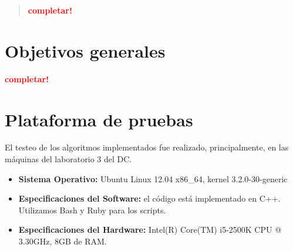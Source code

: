 \documentclass[a4paper]{article}
\begin{document}

\thispagestyle{empty}

\maketitle
\newpage

\thispagestyle{empty}
\vfill
\begin{abstract}
    \textcolor{red}{\textbf{completar!}}
\end{abstract}

\thispagestyle{empty}
\vspace{3cm}
\tableofcontents
\newpage


\newpage

\section{Objetivos generales}
  \textcolor{red}{\textbf{completar!}}

\newpage

\section{Plataforma de pruebas}
El testeo de los algoritmos implementados fue realizado, principalmente, en las máquinas del laboratorio 3 del DC. \newline
\begin{itemize}
  \item \textbf{Sistema Operativo:} Ubuntu Linux 12.04 x86_64, kernel 3.2.0-30-generic
  
  \item \textbf{Especificaciones del Software:} el código está implementado en C++. Utilizamos Bash y Ruby para los scripts.
  
  \item \textbf{Especificaciones del Hardware:} Intel(R) Core(TM) i5-2500K CPU @ 3.30GHz, 8GB de RAM.
\end{itemize}
\end{document}
